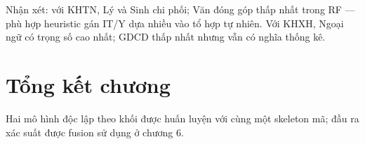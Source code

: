 Nhận xét: với KHTN, Lý và Sinh chi phối; Văn đóng góp thấp nhất trong RF --- phù hợp heuristic gán IT/Y dựa nhiều vào tổ hợp tự nhiên. Với KHXH, Ngoại ngữ có trọng số cao nhất; GDCD thấp nhất nhưng vẫn có nghĩa thống kê.


\section{Tổng kết chương}
Hai mô hình độc lập theo khối được huấn luyện với cùng một skeleton mã; đầu ra xác suất được fusion sử dụng ở chương 6.
